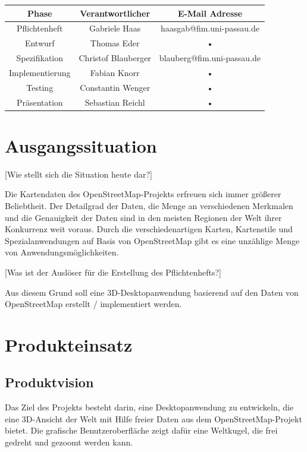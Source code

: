 \documentclass[10pt]{report}
\begin{document}
\begin{center}
\vspace{1.5 cm}
\begin{tabular}{|c|c|c|}
\hline 
\rule[-1ex]{0pt}{4ex} \textbf{Phase} & \textbf{Verantwortlicher} & \textbf{E-Mail Adresse} \\ 
\hline  \hline
\rule[-1ex]{0pt}{4ex} Pflichtenheft & Gabriele Haas & haasgab@fim.uni-passau.de \\ 
\hline  \hline
\rule[-1ex]{0pt}{4ex} Entwurf & Thomas Eder & • \\ 
\hline  \hline
\rule[-1ex]{0pt}{4ex} Spezifikation & Christof Blauberger & blauberg@fim.uni-passau.de \\ 
\hline  \hline
\rule[-1ex]{0pt}{4ex} Implementierung & Fabian Knorr & • \\ 
\hline \hline 
\rule[-1ex]{0pt}{4ex} Testing & Constantin Wenger & • \\ 
\hline  \hline
\rule[-1ex]{0pt}{4ex} Präsentation & Sebastian Reichl & • \\ 
\hline 
\end{tabular}

\end{center}


\tableofcontents


\chapter{Ausgangssituation}
[Wie stellt sich die Situation heute dar?]

Die Kartendaten des OpenStreetMap-Projekts erfreuen sich immer größerer Beliebtheit. Der Detailgrad der Daten, die Menge an verschiedenen Merkmalen und die Genauigkeit der Daten sind in den meisten Regionen der Welt ihrer Konkurrenz weit voraus. Durch die verschiedenartigen Karten, Kartenstile und Spezialanwendungen auf Basis von OpenStreetMap gibt es eine unzählige Menge von Anwendungsmöglichkeiten.


[Was ist der Auslöser für die Erstellung des Pflichtenhefts?]

Aus diesem Grund soll eine 3D-Desktopanwendung basierend auf den Daten von OpenStreetMap erstellt / implementiert werden.


\chapter{Produkteinsatz}
\section{Produktvision}
Das Ziel des Projekts besteht darin, eine Desktopanwendung zu entwickeln, die eine 3D-Ansicht der Welt mit Hilfe freier Daten aus dem OpenStreetMap-Projekt bietet. Die grafische Benutzeroberﬂäche zeigt dafür eine Weltkugel, die frei gedreht und gezoomt werden kann. 
\end{document}
